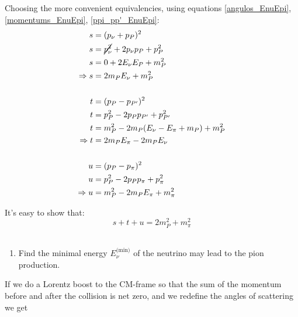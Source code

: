 \documentclass[]{article}
\numberwithin{equation}{section}
\newcommand{\0}{\textcolor{gray}{0}}
\begin{document}
Choosing the more convenient equivalencies, using equations \ref{angulos_EnuEpi}, \ref{momentums_EnuEpi}, \ref{ppi_pp'_EnuEpi}:
\begin{align}
	s &= (p_\nu + p_P)^2\nonumber\\
	s &= \cancel{p_\nu^2} + 2 p_\nu p_P + p_P^2\nonumber\\
	s &= 0 + 2 E_\nu E_P + m_P^2\nonumber\\
	\Rightarrow s &= 2 m_P E_\nu + m_P^2\\\nonumber\\
	t &= (p_P - p_{P'})^2\nonumber\\
	t &= p_P^2 - 2 p_P p_{P'} + p_{P'}^2\nonumber\\
	t &= m_P^2 - 2 m_P (E_\nu - E_\pi + m_P) + m_P^2\nonumber\\
	\Rightarrow t &= 2 m_P E_\pi - 2 m_P E_\nu\\\nonumber\\
	u &= (p_P - p_\pi)^2\nonumber\\
	u &= p_P^2 - 2 p_P p_\pi + p_\pi^2\nonumber\\
	\Rightarrow u &= m_P^2 - 2 m_P E_\pi + m_\pi^2
\end{align}

It's easy to show that:
\begin{equation}
	s + t + u = 2 m_P^2 + m_\pi^2
\end{equation}
\\

\begin{enumerate}
\item[\textbf{c.}] Find the minimal energy \(E^\text{(min)}_\nu\) of the neutrino may lead to the pion production.
\end{enumerate}
If we do a Lorentz boost to the CM-frame so that the sum of the momentum before and after the collision is net zero, and we redefine the angles of scattering we get
\end{document}
